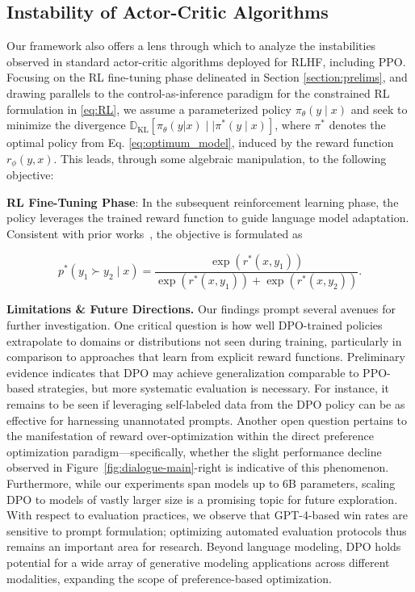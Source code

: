 \subsection{Instability of Actor-Critic Algorithms} Our framework also offers a lens through which to analyze the instabilities observed in standard actor-critic algorithms deployed for RLHF, including PPO. Focusing on the RL fine-tuning phase delineated in Section \ref{section:prelims}, and drawing parallels to the control-as-inference paradigm \cite{levine2018reinforcement} for the constrained RL formulation in \ref{eq:RL}, we assume a parameterized policy $\pi_{\theta}(y\mid x)$ and seek to minimize the divergence $\mathbb{D}_{\text{KL}}[\pi_{\theta}(y|x) \mid \mid \pi^*(y\mid x)]$, where $\pi^*$ denotes the optimal policy from Eq. \ref{eq:optimum_model}, induced by the reward function $r_{\phi}(y, x)$. This leads, through some algebraic manipulation, to the following objective:

\textbf{RL Fine-Tuning Phase}: In the subsequent reinforcement learning phase, the policy leverages the trained reward function to guide language model adaptation. Consistent with prior works~\citep{jaques2017sequence, jaques2020human}, the objective is formulated as

\begin{equation}\label{eq:bradley-terry}
    p^*(y_1\succ y_2 \mid x)=\frac{\exp\left(r^*(x, y_1)\right)}{\exp\left(r^*(x, y_1)\right) + \exp\left(r^*(x, y_2)\right)}.
\end{equation}

\textbf{Limitations \& Future Directions.} Our findings prompt several avenues for further investigation. One critical question is how well DPO-trained policies extrapolate to domains or distributions not seen during training, particularly in comparison to approaches that learn from explicit reward functions. Preliminary evidence indicates that DPO may achieve generalization comparable to PPO-based strategies, but more systematic evaluation is necessary. For instance, it remains to be seen if leveraging self-labeled data from the DPO policy can be as effective for harnessing unannotated prompts. Another open question pertains to the manifestation of reward over-optimization within the direct preference optimization paradigm—specifically, whether the slight performance decline observed in Figure~\ref{fig:dialogue-main}-right is indicative of this phenomenon. Furthermore, while our experiments span models up to 6B parameters, scaling DPO to models of vastly larger size is a promising topic for future exploration. With respect to evaluation practices, we observe that GPT-4-based win rates are sensitive to prompt formulation; optimizing automated evaluation protocols thus remains an important area for research. Beyond language modeling, DPO holds potential for a wide array of generative modeling applications across different modalities, expanding the scope of preference-based optimization.

